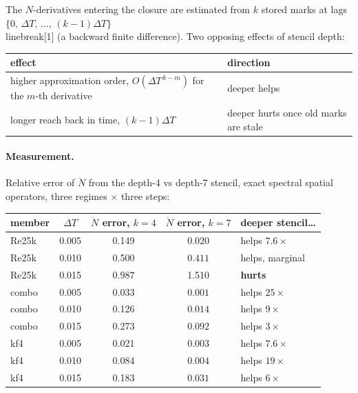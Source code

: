 \documentclass[11pt]{article}
\theoremstyle{remark}
\newcommand{\DT}{\Delta T}
\begin{document}
The $N$-derivatives entering the closure are estimated from $k$ stored marks
at lags $\{0,\, \DT,\, \dots,\, (k{-}1)\DT\}$\\linebreak[1] (a backward finite difference). Two
opposing effects of stencil depth:

\begin{center}\small
\begin{tabular}{ll}
\toprule
effect & direction\\
\midrule
higher approximation order, $O(\DT^{\,k-m})$ for the $m$-th derivative & deeper helps\\
longer reach back in time, $(k{-}1)\DT$ & deeper hurts once old marks are stale\\
\bottomrule
\end{tabular}
\end{center}

\paragraph{Measurement.}
Relative error of $\ddot N$ from the depth-4 vs depth-7 stencil, exact
spectral spatial operators, three regimes $\times$ three steps:

\begin{center}
\begin{tabular}{lcccl}
\toprule
member & $\DT$ & $\ddot N$ error, $k{=}4$ & $\ddot N$ error, $k{=}7$ & deeper stencil\ldots\\
\midrule
Re25k & 0.005 & 0.149 & $\mathbf{0.020}$ & helps $7.6\times$\\
Re25k & 0.010 & 0.500 & $\mathbf{0.411}$ & helps, marginal\\
Re25k & 0.015 & $\mathbf{0.987}$ & 1.510 & \textbf{hurts}\\
combo & 0.005 & 0.033 & $\mathbf{0.001}$ & helps $25\times$\\
combo & 0.010 & 0.126 & $\mathbf{0.014}$ & helps $9\times$\\
combo & 0.015 & 0.273 & $\mathbf{0.092}$ & helps $3\times$\\
kf4   & 0.005 & 0.021 & $\mathbf{0.003}$ & helps $7.6\times$\\
kf4   & 0.010 & 0.084 & $\mathbf{0.004}$ & helps $19\times$\\
kf4   & 0.015 & 0.183 & $\mathbf{0.031}$ & helps $6\times$\\
\bottomrule
\end{tabular}
\end{center}
\end{document}
